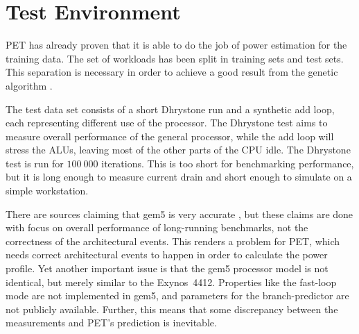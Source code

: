 \section{Test Environment}

PET has already proven that it is able to do the job of power estimation for the
training data. The set of workloads has been split in training sets and test
sets. This separation is necessary in order to achieve a good result from the
genetic algorithm \cite{russellnorvig,rajer2003separation}.

The test data set consists of a short Dhrystone run and a synthetic add loop,
each representing different use of the processor. The Dhrystone test aims
to measure overall performance of the general processor, while the add loop will
stress the ALUs, leaving most of the other parts of the CPU idle. The Dhrystone
test is run for $100~000$ iterations. This is too short for benchmarking
performance, but it is long enough to measure current drain and short enough to
simulate on a simple workstation.

There are sources claiming that gem5 is very accurate
\cite{butko2012accuracy,pusdesrissources}, but these claims are done with focus
on overall performance of long-running benchmarks, not the correctness of the
architectural events. This renders a problem for PET, which needs correct
architectural events to happen in order to calculate the power profile. Yet
another important issue is that the gem5 processor model is not identical, but
merely similar to the Exynos~4412. Properties like the fast-loop mode are not
implemented in gem5, and parameters for the branch-predictor are not publicly
available. Further, this means that some discrepancy between the measurements
and PET's prediction is inevitable.
